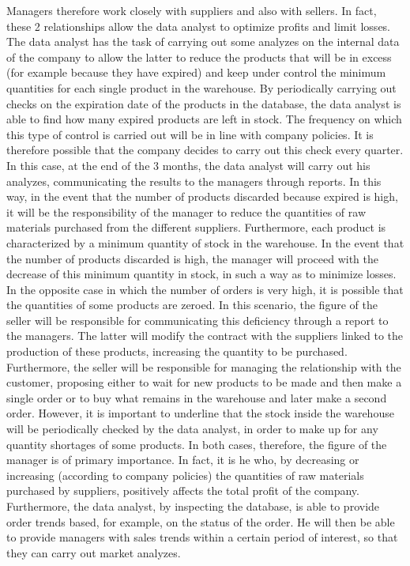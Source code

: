 Managers therefore work closely with suppliers and also with sellers. In fact, these 2 relationships allow the data analyst to optimize profits and limit losses. The data analyst has the task of carrying out some analyzes on the internal data of the company to allow the latter to reduce the products that will be in excess (for example because they have expired) and keep under control the minimum quantities for each single product in the warehouse. By periodically carrying out checks on the expiration date of the products in the database, the data analyst is able to find how many expired products are left in stock. The frequency on which this type of control is carried out will be in line with company policies. It is therefore possible that the company decides to carry out this check every quarter. In this case, at the end of the 3 months, the data analyst will carry out his analyzes, communicating the results to the managers through reports. In this way, in the event that the number of products discarded because expired is high, it will be the responsibility of the manager to reduce the quantities of raw materials purchased from the different suppliers. Furthermore, each product is characterized by a minimum quantity of stock in the warehouse. In the event that the number of products discarded is high, the manager will proceed with the decrease of this minimum quantity in stock, in such a way as to minimize losses. In the opposite case in which the number of orders is very high, it is possible that the quantities of some products are zeroed. In this scenario, the figure of the seller will be responsible for communicating this deficiency through a report to the managers. The latter will modify the contract with the suppliers linked to the production of these products, increasing the quantity to be purchased. Furthermore, the seller will be responsible for managing the relationship with the customer, proposing either to wait for new products to be made and then make a single order or to buy what remains in the warehouse and later make a second order. However, it is important to underline that the stock inside the warehouse will be periodically checked by the data analyst, in order to make up for any quantity shortages of some products. In both cases, therefore, the figure of the manager is of primary importance. In fact, it is he who, by decreasing or increasing (according to company policies)
the quantities of raw materials purchased by suppliers, positively affects the total profit of the company.
Furthermore, the data analyst, by inspecting the database, is able to provide order trends based, for example, on the status of the order. He will then be able to provide managers with sales trends within a certain period of interest, so that they can carry out market analyzes.

